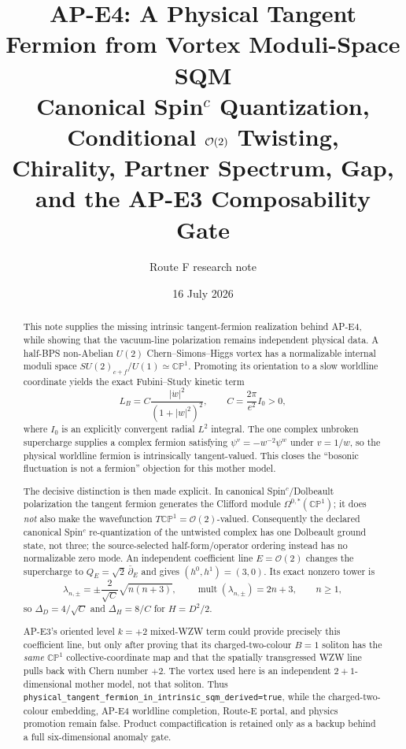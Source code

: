 \documentclass[11pt]{article}
\title{AP-E4: A Physical Tangent Fermion from Vortex Moduli-Space SQM\\
Canonical Spin\texorpdfstring{\({}^c\)}{c} Quantization, Conditional
\(\cO(2)\) Twisting,\\ Chirality, Partner Spectrum, Gap, and the AP-E3
Composability Gate}
\author{Route F research note}
\date{16 July 2026}
\theoremstyle{definition}
\theoremstyle{remark}
\newcommand{\CP}{\mathbb {CP}}
\newcommand{\cO}{\mathcal O}
\begin{document}
\maketitle

\begin{abstract}
This note supplies the missing intrinsic tangent-fermion realization behind
AP-E4, while showing that the vacuum-line polarization remains independent
physical data.
A half-BPS non-Abelian \(U(2)\) Chern--Simons--Higgs vortex has a normalizable
internal moduli space
\(SU(2)_{c+f}/U(1)\simeq\CP^1\).  Promoting its orientation to a slow
worldline coordinate yields the exact Fubini--Study kinetic term
\[
 L_B=C\frac{|\dot w|^2}{(1+|w|^2)^2},\qquad
 C=\frac{2\pi}{e^2}I_0>0,
\]
where \(I_0\) is an explicitly convergent radial \(L^2\) integral.  The one
complex unbroken supercharge supplies a complex fermion satisfying
\(\psi^v=-w^{-2}\psi^w\) under \(v=1/w\), so the physical worldline fermion is
intrinsically tangent-valued.  This closes the ``bosonic fluctuation is not a
fermion'' objection for this mother model.

The decisive distinction is then made explicit.  In canonical
Spin\({}^c\)/Dolbeault polarization the tangent fermion generates the
Clifford module \(\Omega^{0,*}(\CP^1)\); it does \emph{not} also make the
wavefunction \(T\CP^1=\cO(2)\)-valued.  Consequently the declared canonical
Spin\({}^c\) re-quantization of the untwisted complex has one Dolbeault ground
state, not three; the source-selected half-form/operator ordering instead has
no normalizable zero mode.  An independent coefficient line
\(E=\cO(2)\) changes the supercharge to
\(Q_E=\sqrt2\,\bar\partial_E\) and gives
\((h^0,h^1)=(3,0)\).  Its exact nonzero tower is
\[
 \lambda_{n,\pm}=\pm\frac{2}{\sqrt C}\sqrt{n(n+3)},\qquad
 \operatorname{mult}(\lambda_{n,\pm})=2n+3,\qquad n\ge1,
\]
so \(\Delta_D=4/\sqrt C\) and
\(\Delta_H=8/C\) for \(H=D^2/2\).

AP-E3's oriented level \(k=+2\) mixed-WZW term could provide precisely this
coefficient line, but only after proving that its charged-two-colour
\(B=1\) soliton has the \emph{same} \(\CP^1\) collective-coordinate map and
that the spatially transgressed WZW line pulls back with Chern number \(+2\).
The vortex used here is
an independent \(2+1\)-dimensional mother model, not that soliton.  Thus
\texttt{physical\_tangent\_fermion\_in\_intrinsic\_sqm\_derived=true}, while
the charged-two-colour embedding, AP-E4 worldline completion, Route-E portal,
and physics promotion remain false.  Product compactification is retained
only as a backup behind a full six-dimensional anomaly gate.
\end{abstract}
\end{document}
